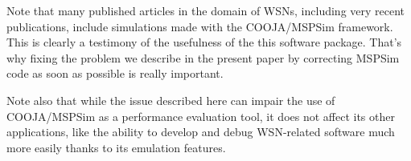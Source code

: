 \documentclass[10pt]{ewsn-proc}
\begin{document}
Note that many published articles in the domain of WSNs, including
very recent publications, include simulations made with the COOJA/MSPSim
framework. This is clearly a testimony of the usefulness of the this
software package. That's why fixing the problem we describe in the present
paper by correcting MSPSim code as soon as possible is really important.

Note also that while the issue described here can impair the use of
COOJA/MSPSim as a performance evaluation tool, it does not affect its other
applications, like the ability to develop and debug WSN-related software much
more easily thanks to its emulation features.



\balance


\end{document}
